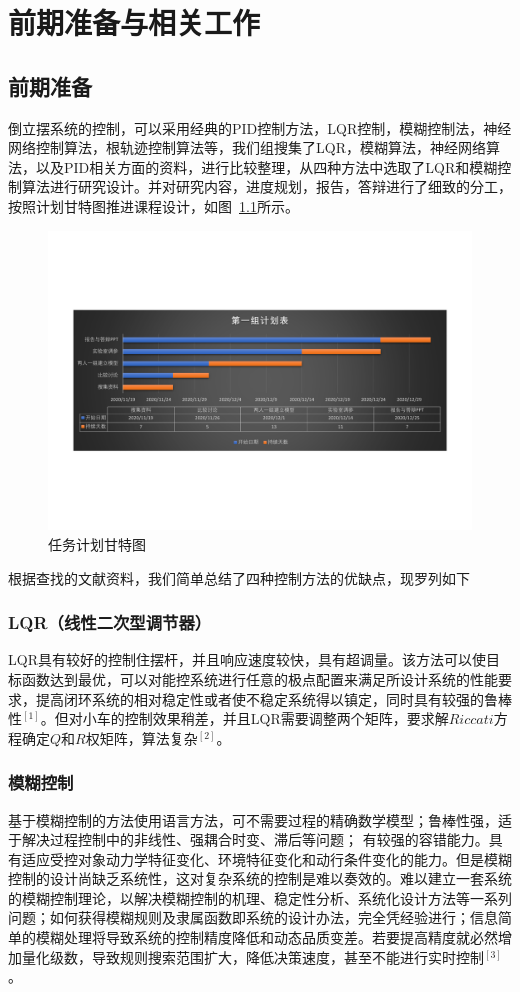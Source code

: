 \chapter{前期准备与相关工作}
\section{前期准备}

倒立摆系统的控制，可以采用经典的PID控制方法，LQR控制，模糊控制法，神经网络控制算法，根轨迹控制算法等，我们组搜集了LQR，模糊算法，神经网络算法，以及PID相关方面的资料，进行比较整理，从四种方法中选取了LQR和模糊控制算法进行研究设计。并对研究内容，进度规划，报告，答辩进行了细致的分工，按照计划甘特图推进课程设计，如图~\ref{fig:gant}所示。

\begin{figure}[h]
\centering
    \includegraphics[width=12cm]{gant.pdf}
    \caption{任务计划甘特图}
    \label{fig:gant}
\end{figure}


根据查找的文献资料，我们简单总结了四种控制方法的优缺点，现罗列如下

\subsection{LQR（线性二次型调节器）}
 LQR具有较好的控制住摆杆，并且响应速度较快，具有超调量。该方法可以使目标函数达到最优，可以对能控系统进行任意的极点配置来满足所设计系统的性能要求，提高闭环系统的相对稳定性或者使不稳定系统得以镇定，同时具有较强的鲁棒性$^{[1]}$。但对小车的控制效果稍差，并且LQR需要调整两个矩阵，要求解$Riccati$方程确定$Q$和$R$权矩阵，算法复杂$^{[2]}$。

\subsection{模糊控制}
基于模糊控制的方法使用语言方法，可不需要过程的精确数学模型；鲁棒性强，适于解决过程控制中的非线性、强耦合时变、滞后等问题；
有较强的容错能力。具有适应受控对象动力学特征变化、环境特征变化和动行条件变化的能力。但是模糊控制的设计尚缺乏系统性，这对复杂系统的控制是难以奏效的。难以建立一套系统的模糊控制理论，以解决模糊控制的机理、稳定性分析、系统化设计方法等一系列问题；如何获得模糊规则及隶属函数即系统的设计办法，完全凭经验进行；信息简单的模糊处理将导致系统的控制精度降低和动态品质变差。若要提高精度就必然增加量化级数，导致规则搜索范围扩大，降低决策速度，甚至不能进行实时控制$^{[3]}$。

